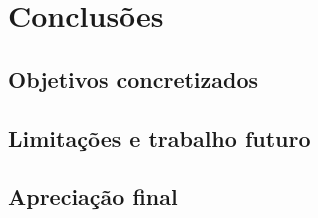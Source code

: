 \chapter{Conclusões}
\label{sec:5-Conclusoes}



\section{Objetivos concretizados}


\section{Limitações e trabalho futuro}



\section{Apreciação final}

